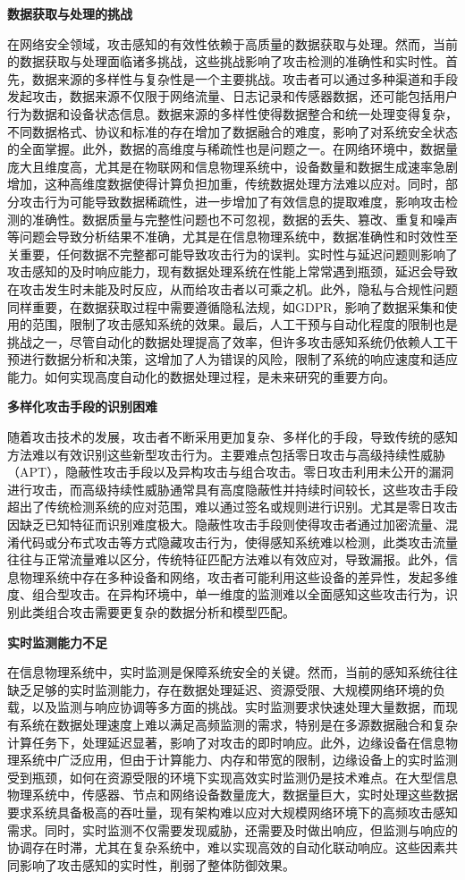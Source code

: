 \textbf{数据获取与处理的挑战}

在网络安全领域，攻击感知的有效性依赖于高质量的数据获取与处理。然而，当前的数据获取与处理面临诸多挑战，这些挑战影响了攻击检测的准确性和实时性。首先，数据来源的多样性与复杂性是一个主要挑战。攻击者可以通过多种渠道和手段发起攻击，数据来源不仅限于网络流量、日志记录和传感器数据，还可能包括用户行为数据和设备状态信息。数据来源的多样性使得数据整合和统一处理变得复杂，不同数据格式、协议和标准的存在增加了数据融合的难度，影响了对系统安全状态的全面掌握。此外，数据的高维度与稀疏性也是问题之一。在网络环境中，数据量庞大且维度高，尤其是在物联网和信息物理系统中，设备数量和数据生成速率急剧增加，这种高维度数据使得计算负担加重，传统数据处理方法难以应对。同时，部分攻击行为可能导致数据稀疏性，进一步增加了有效信息的提取难度，影响攻击检测的准确性。数据质量与完整性问题也不可忽视，数据的丢失、篡改、重复和噪声等问题会导致分析结果不准确，尤其是在信息物理系统中，数据准确性和时效性至关重要，任何数据不完整都可能导致攻击行为的误判。实时性与延迟问题则影响了攻击感知的及时响应能力，现有数据处理系统在性能上常常遇到瓶颈，延迟会导致在攻击发生时未能及时反应，从而给攻击者以可乘之机。此外，隐私与合规性问题同样重要，在数据获取过程中需要遵循隐私法规，如GDPR，影响了数据采集和使用的范围，限制了攻击感知系统的效果。最后，人工干预与自动化程度的限制也是挑战之一，尽管自动化的数据处理提高了效率，但许多攻击感知系统仍依赖人工干预进行数据分析和决策，这增加了人为错误的风险，限制了系统的响应速度和适应能力。如何实现高度自动化的数据处理过程，是未来研究的重要方向。

\textbf{多样化攻击手段的识别困难}

随着攻击技术的发展，攻击者不断采用更加复杂、多样化的手段，导致传统的感知方法难以有效识别这些新型攻击行为。主要难点包括零日攻击与高级持续性威胁（APT），隐蔽性攻击手段以及异构攻击与组合攻击。零日攻击利用未公开的漏洞进行攻击，而高级持续性威胁通常具有高度隐蔽性并持续时间较长，这些攻击手段超出了传统检测系统的应对范围，难以通过签名或规则进行识别。尤其是零日攻击因缺乏已知特征而识别难度极大。隐蔽性攻击手段则使得攻击者通过加密流量、混淆代码或分布式攻击等方式隐藏攻击行为，使得感知系统难以检测，此类攻击流量往往与正常流量难以区分，传统特征匹配方法难以有效应对，导致漏报。此外，信息物理系统中存在多种设备和网络，攻击者可能利用这些设备的差异性，发起多维度、组合型攻击。在异构环境中，单一维度的监测难以全面感知这些攻击行为，识别此类组合攻击需要更复杂的数据分析和模型匹配。

\textbf{实时监测能力不足}

在信息物理系统中，实时监测是保障系统安全的关键。然而，当前的感知系统往往缺乏足够的实时监测能力，存在数据处理延迟、资源受限、大规模网络环境的负载，以及监测与响应协调等多方面的挑战。实时监测要求快速处理大量数据，而现有系统在数据处理速度上难以满足高频监测的需求，特别是在多源数据融合和复杂计算任务下，处理延迟显著，影响了对攻击的即时响应。此外，边缘设备在信息物理系统中广泛应用，但由于计算能力、内存和带宽的限制，边缘设备上的实时监测受到瓶颈，如何在资源受限的环境下实现高效实时监测仍是技术难点。在大型信息物理系统中，传感器、节点和网络设备数量庞大，数据量巨大，实时处理这些数据要求系统具备极高的吞吐量，现有架构难以应对大规模网络环境下的高频攻击感知需求。同时，实时监测不仅需要发现威胁，还需要及时做出响应，但监测与响应的协调存在时滞，尤其在复杂系统中，难以实现高效的自动化联动响应。这些因素共同影响了攻击感知的实时性，削弱了整体防御效果。

